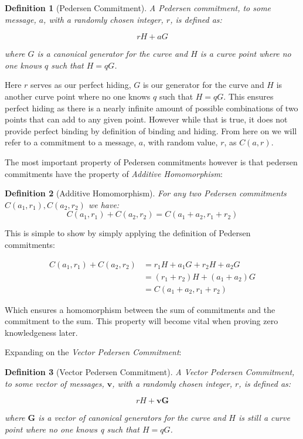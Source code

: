 \documentclass{article}
\newtheorem{definition}{Definition}[section]
\newcommand{\eq}[1]{\begin{equation*}\begin{split}#1\end{split}\end{equation*}}
\begin{document}
\begin{definition}[Pedersen Commitment]
	A Pedersen commitment, to some message, $a$, with a randomly chosen
	integer, $r$, is defined as:

	$$rH + aG$$

	where $G$ is a canonical generator for the curve and $H$ is a curve point where no one knows $q$ such that $H = qG$.
\end{definition}

Here $r$ serves as our perfect hiding, $G$ is our generator for the
curve and $H$ is another curve point where no one knows $q$ such that
$H = qG$. This ensures perfect hiding as there is a nearly infinite
amount of possible combinations of two points that can add to any given
point. However while that is true, it does not provide perfect binding by
definition of binding and hiding. From here on we will refer to a
commitment to a message, $a$, with random value, $r$, as $C(a,r)$.

The most important property of Pedersen commitments however is
that pedersen commitments have the property of \textit{Additive
Homomorphism}:

\begin{definition}[Additive Homomorphism]
	For any two Pedersen commitments $C(a_1,r_1), C(a_2,r_2)$ we have:
	$$ C(a_1,r_1) + C(a_2,r_2) = C(a_1 + a_2, r_1 + r_2)$$
\end{definition}

This is simple to show by simply applying the definition of Pedersen
commitments: 

\eq{
	C(a_1,r_1) + C(a_2,r_2) &= r_1H + a_1G  + r_2H + a_2G \\
	                        &= (r_1 + r_2)H + (a_1 + a_2)G \\
	                        &= C(a_1+a_2,r_1+r_2)
}

Which ensures a homomorphism between the sum of commitments and the
commitment to the sum. This property will become vital when proving zero
knowledgeness later. 

Expanding on the \textit{Vector Pedersen Commitment}:
\begin{definition}[Vector Pedersen Commitment]
	A Vector Pedersen Commitment, to some vector of messages,
	$\textbf{v}$, with a randomly chosen integer, $r$,
	is defined as:

	$$rH + \textbf{vG}$$

	where $\textbf{G}$ is a vector of canonical generators for
	the curve and $H$ is still a curve point where no one knows q such that $H = qG$.
\end{definition}
\end{document}
